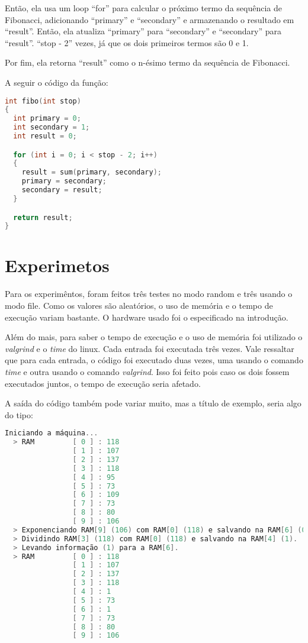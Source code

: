 \documentclass{article}
\begin{document}
Então, ela usa um loop “for” para calcular o próximo termo da sequência de Fibonacci, adicionando “primary” e “secondary” e armazenando o resultado em “result”. Então, ela atualiza “primary” para “secondary” e “secondary” para “result”. “stop - 2” vezes, já que os dois primeiros termos são 0 e 1.

Por fim, ela retorna “result” como o n-ésimo termo da sequência de Fibonacci.

\hfill\breakline

 \noindent A seguir o código da função:
 \begin{lstlisting}[caption={Função de Fibonacci.},label={lst:cod4},language=C]
int fibo(int stop)
{
  int primary = 0;
  int secondary = 1;
  int result = 0;

  for (int i = 0; i < stop - 2; i++)
  {
    result = sum(primary, secondary);
    primary = secondary;
    secondary = result;
  }

  return result;
}
 \end{lstlisting}
 \clearpage

\section{Experimetos}
\DESCRICAO{}

Para os experimêntos, foram feitos três testes no modo random e três usando o modo file. Como os valores são aleatórios, o uso de memória e o tempo de execução variam bastante. O hardware usado foi o especificado na introdução.

Além do mais, para saber o tempo de execução e o uso de memória foi utilizado o \textit{valgrind} e o \textit{time} do linux. Cada entrada foi executada três vezes. 
Vale ressaltar que para cada entrada, o código foi executado duas vezes, uma usando o comando \textit{time} e outra usando o comando \textit{valgrind}. Isso foi feito pois caso os dois fossem executados juntos, o tempo de execução seria afetado.

A saída do código também pode variar muito, mas a título de exemplo, seria algo do tipo:
 \begin{lstlisting}[caption={Exemplo de saída.},label={lst:cod5},language=C]
Iniciando a máquina...
  > RAM         [ 0 ] : 118
                [ 1 ] : 107
                [ 2 ] : 137
                [ 3 ] : 118
                [ 4 ] : 95
                [ 5 ] : 73
                [ 6 ] : 109
                [ 7 ] : 73
                [ 8 ] : 80
                [ 9 ] : 106
  > Exponenciando RAM[9] (106) com RAM[0] (118) e salvando na RAM[6] (0).
  > Dividindo RAM[3] (118) com RAM[0] (118) e salvando na RAM[4] (1).
  > Levando informação (1) para a RAM[6].
  > RAM         [ 0 ] : 118
                [ 1 ] : 107
                [ 2 ] : 137
                [ 3 ] : 118
                [ 4 ] : 1
                [ 5 ] : 73
                [ 6 ] : 1
                [ 7 ] : 73
                [ 8 ] : 80
                [ 9 ] : 106
 \end{lstlisting}
\end{document}
